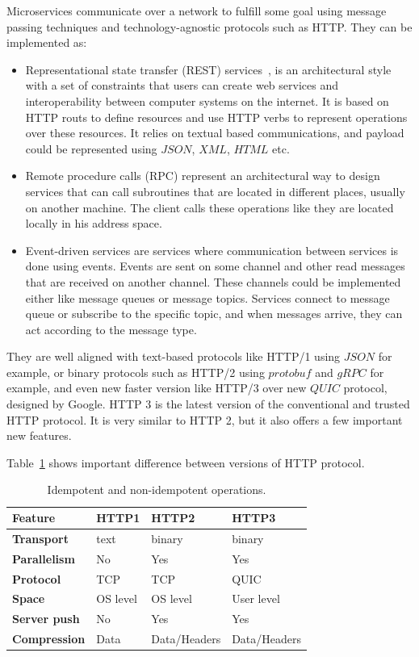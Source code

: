 Microservices communicate over a network to fulfill some goal using message passing techniques and technology-agnostic protocols such as HTTP. They can be implemented as:

\begin{itemize}
	\item Representational state transfer (REST) services~\cite{AdamczykSJH11}, is an architectural style with a set of constraints that users can create web services and interoperability between computer systems on the internet. It is based on HTTP routs to define resources and use HTTP verbs to represent operations over these resources. It relies on textual based communications, and payload could be represented using $JSON$, $XML$, $HTML$ etc.
	\item Remote procedure calls (RPC) represent an architectural way to design services that can call subroutines that are located in different places, usually on another machine. The client calls these operations like they are located locally in his address space.
	\item Event-driven services are services where communication between services is done using events. Events are sent on some channel and other read messages that are received on another channel. These channels could be implemented either like message queues or message topics. Services connect to message queue or subscribe to the specific topic, and when messages arrive, they can act according to the message type.
\end{itemize}

\noindent
They are well aligned with text-based protocols like HTTP/1 using $JSON$ for example, or binary protocols such as HTTP/2 using $protobuf$ and $gRPC$ for example, and even new faster version like HTTP/3 over new $QUIC$ protocol, designed by Google. HTTP 3 is the latest version of the conventional and trusted HTTP protocol. It is very similar to HTTP 2, but it also offers a few important new features. 

Table~\ref{tab:table9} shows important difference between versions of HTTP protocol.

\begin{table}[h!]
	\begin{center}
		\begin{tabular}{l|l|l|l}
			\textbf{Feature} & \textbf{HTTP1} & \textbf{HTTP2} & \textbf{HTTP3}\\
			\hline
			\textbf{Transport} & text & binary & binary\\
			\textbf{Parallelism} & No & Yes & Yes\\
			\textbf{Protocol} & TCP & TCP & QUIC \\
			\textbf{Space} & OS level & OS level & User level\\
			\textbf{Server push} & No & Yes & Yes\\
			\textbf{Compression} & Data & Data/Headers & Data/Headers\\
		\end{tabular}
	\end{center}
	\vspace{-0.5cm}
	\caption{Idempotent and non-idempotent operations.}
	\label{tab:table9}
\end{table}

